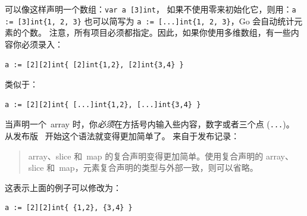 可以像这样声明一个数组：\lstinline{var a [3]int}，
如果不使用零来初始化它，则用：\lstinline|a := [3]int{1, 2, 3}| 也可以简写为
\lstinline|a := [...]int{1, 2, 3}|，Go 会自动统计元素的个数。
注意，所有项目必须都指定。因此，如果你使用多维数组，有一些内容你必须录入：
\begin{lstlisting}
a := [2][2]int{ [2]int{1,2}, [2]int{3,4} }
\end{lstlisting}
类似于：
\begin{lstlisting}
a := [2][2]int{ [...]int{1,2}, [...]int{3,4} }
\end{lstlisting}
当声明一个~array 时，你\emph{必须}在方括号内输入些内容，数字或者三个点
(\verb|...|)。%
从发布版~\cite{go_release_hist} 开始这个语法就变得更加简单了。
来自于发布记录：
\begin{quote}
array、slice 和~map 的复合声明变得更加简单。使用复合声明的
array、slice 和~map，元素复合声明的类型与外部一致，则可以省略。
\end{quote}
这表示上面的例子可以修改为：
\begin{lstlisting}
a := [2][2]int{ {1,2}, {3,4} }
\end{lstlisting}


